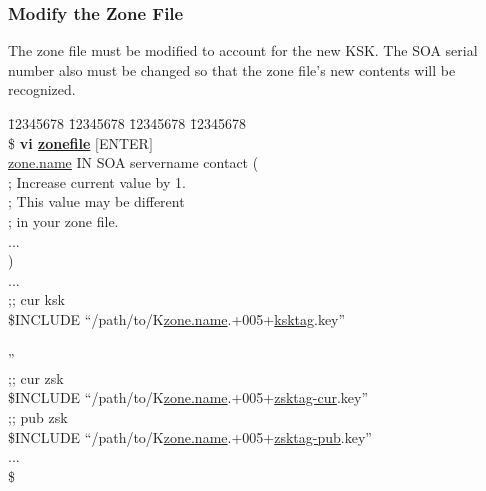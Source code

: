 
\subsubsection{Modify the Zone File}

The zone file must be modified to account for the new KSK.  The SOA serial
number also must be changed so that the zone file's new contents will be
recognized.

\begin{tabbing}
\hspace{0.5in} \= 12345678 \= 12345678 \= 12345678 \= 12345678 \kill \\
\hspace{0.5in}\$ {\bf vi \underline{zonefile}} $[$ENTER$]$ \\
\hspace{0.5in}\underline{zone.name}        IN     SOA        servername contact ( \\
\hspace{3.5in}{\bf 2005092103} ; Increase current value by 1. \\
\hspace{4.4in};  This value may be different \\
\hspace{4.4in}; in your zone file. \\
\hspace{0.5in}\>           \>         ... \\
\hspace{0.5in}\>              ) \\
\hspace{0.5in}... \\
\hspace{0.5in};; cur ksk \\
\hspace{0.5in}\$INCLUDE ``/path/to/K\underline{zone.name}.+005+\underline{ksktag}.key'' \\
\hspace{0.5in}{\bf ;; new ksk} \\
'' \\
\hspace{0.5in};; cur zsk \\
\hspace{0.5in}\$INCLUDE ``/path/to/K\underline{zone.name}.+005+\underline{zsktag-cur}.key'' \\
\hspace{0.5in};; pub zsk \\
\hspace{0.5in}\$INCLUDE ``/path/to/K\underline{zone.name}.+005+\underline{zsktag-pub}.key'' \\
\hspace{0.5in}... \\
\hspace{0.5in}\$ \\
\end{tabbing}

